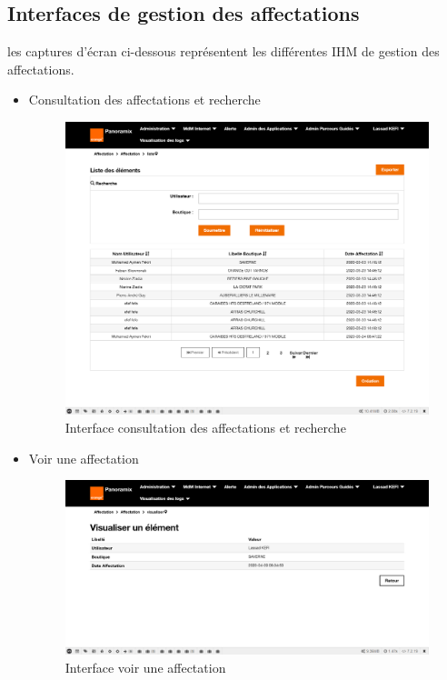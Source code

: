 \subsection{Interfaces de gestion des affectations}
les captures d'écran ci-dessous représentent les différentes IHM de gestion des affectations.
\begin{itemize}
	\item Consultation des affectations et recherche
	\begin{figure}[H]
		\centering
		\includegraphics[width=0.6\linewidth]{"img/screenshots/affectation users-boutique/index"}
		\caption[Interface consultation des affectations et recherche]{Interface consultation des affectations et recherche}
		\label{fig:index-affectation}
	\end{figure}
	
	\item Voir une affectation
	\begin{figure}[H]
		\centering
		\includegraphics[width=0.6\linewidth]{"img/screenshots/affectation users-boutique/view"}
		\caption[Interface voir une affectation]{Interface voir une affectation}
		\label{fig:view-affectation}
	\end{figure}


\end{itemize}
